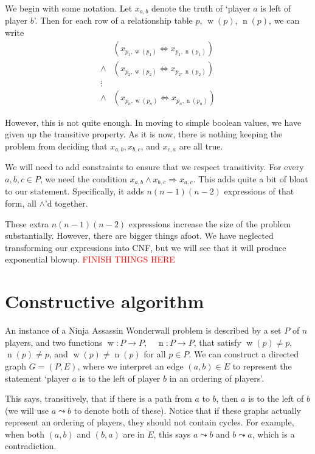 \documentclass[12pt]{article}
\DeclareMathOperator{\w}{w}
\DeclareMathOperator{\n}{n}
\begin{document}
We begin with some notation. Let $x_{a,b}$ denote the truth of `player $a$ is left of player $b$'. Then for each row of a relationship table $p$, $\w(p)$, $\n(p)$, we can write
    \begin{align*}
                & (x_{p_1, \w(p_1)} \Leftrightarrow x_{p_1, \n(p_1)})\\
        \wedge  & (x_{p_2, \w(p_2)} \Leftrightarrow x_{p_2, \n(p_2)})\\
        \vdots  &\\
        \wedge  & (x_{p_n, \w(p_n)} \Leftrightarrow x_{p_n, \n(p_n)})
    \end{align*}

However, this is not quite enough. In moving to simple boolean values, we have given up the transitive property. As it is now, there is nothing keeping the problem from deciding that $x_{a,b}, x_{b,c}$, and $x_{c,a}$ are all true.

We will need to add constraints to ensure that we respect transitivity. For every $a,b,c \in P$, we need the condition $x_{a,b} \wedge x_{b,c} \Rightarrow x_{a,c}$. This adds quite a bit of bloat to our statement. Specifically, it adds $n(n-1)(n-2)$ expressions of that form, all $\wedge$'d together.

These extra $n(n-1)(n-2)$ expressions increase the size of the problem substantially. However, there are bigger things afoot. We have neglected transforming our expressions into CNF, but we will see that it will produce exponential blowup. \textcolor{red}{FINISH THINGS HERE} 

\section{Constructive algorithm}
An instance of a Ninja Assassin Wonderwall problem is described by a set $P$ of $n$ players, and two functions $\w : P \to P, \quad \n : P \to P$, that satisfy $\w(p) \neq p$, $\n(p) \neq p$, and $\w(p) \neq \n(p)$ for all $p\in P$. We can construct a directed graph $G=(P,E)$, where we interpret an edge $(a,b) \in E$ to represent the statement `player $a$ is to the left of player $b$ in an ordering of players'. 

This says, transitively, that if there is a path from $a$ to $b$, then $a$ is to the left of $b$ (we will use $a \leadsto b$ to denote both of these). Notice that if these graphs actually represent an ordering of players, they should not contain cycles. For example, when both $(a,b)$ and $(b,a)$ are in $E$, this says $a \leadsto b$ and $b \leadsto a$, which is a contradiction. 
\end{document}
